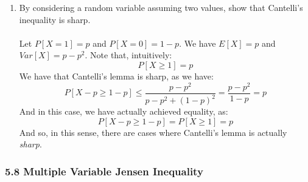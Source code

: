 \documentclass[12pt,a4paper]{article}
\newcommand{\1}[1]{\mathbbm{1}\left\{ #1 \right\}}
\begin{document}
\begin{enumerate}
	\item By considering a random variable assuming two values, show that Cantelli's inequality is sharp.
	\\\\
	Let $P[X = 1] = p$ and $P[X = 0] = 1-p$. We have $E[X] = p$ and $Var[X] = p - p^2$. Note that, intuitively:
	$$
		P[X \geq 1] = p
	$$
	We have that Cantelli's lemma is sharp, as we have:
	$$
		P[X - p \geq 1 - p] \leq
		\frac{p - p^2}{p - p^2 + (1-p)^2} = \frac{p - p^2}{1 - p} = p
	$$
	And in this case, we have actually achieved equality, as:
	$$
		P[X - p \geq 1- p] = P[X \geq 1] = p
	$$
	And so, in this sense, there are cases where Cantelli's lemma is actually \textit{sharp}.
	
\end{enumerate}

\subsubsection{5.8 Multiple Variable Jensen Inequality}
\end{document}
